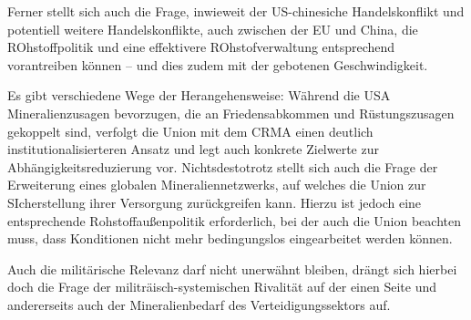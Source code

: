 \documentclass[12pt,a4paper,oneside]{book} %
\begin{document}
Ferner stellt sich auch die Frage, inwieweit der US-chinesiche Handelskonflikt und potentiell weitere Handelskonflikte, auch zwischen der EU und China, die ROhstoffpolitik und eine effektivere ROhstofverwaltung entsprechend vorantreiben können -- und dies zudem mit der gebotenen Geschwindigkeit.

Es gibt verschiedene Wege der Herangehensweise: Während die USA Mineralienzusagen bevorzugen, die an Friedensabkommen und Rüstungszusagen gekoppelt sind, verfolgt die Union mit dem CRMA einen deutlich institutionalisierteren Ansatz und legt auch konkrete Zielwerte zur Abhängigkeitsreduzierung vor. Nichtsdestotrotz stellt sich auch die Frage der Erweiterung eines globalen Mineraliennetzwerks, auf welches die Union zur SIcherstellung ihrer Versorgung zurückgreifen kann. Hierzu ist jedoch eine entsprechende Rohstoffaußenpolitik erforderlich, bei der auch die Union beachten muss, dass Konditionen nicht mehr bedingungslos eingearbeitet werden können. 

Auch die militärische Relevanz darf nicht unerwähnt bleiben, drängt sich hierbei doch die Frage der militräisch-systemischen Rivalität auf der einen Seite und andererseits auch der Mineralienbedarf des Verteidigungssektors auf.

	
\end{document}
